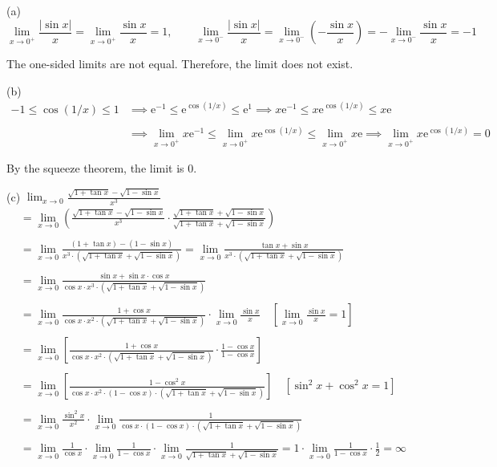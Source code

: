 \documentclass{article}
\begin{document}
\noindent (a) \begin{equation*}\lim_{x\to 0^+} \frac{\left|\sin x\right|}{x}=\lim_{x\to 0^+}\frac{\sin x}{x}=1,\quad\quad \lim_{x\to 0^-} \frac{\left|\sin x\right|}{x}=\lim_{x\to0^-}\left(-\frac{\sin x}{x}\right)=-\lim_{x\to0^-}\frac{\sin x}{x}=-1\end{equation*}

\hfill

\noindent The one-sided limits are not equal. Therefore, the limit does not exist.

\hfill

\noindent (b)
\begin{align*}-1\leq \cos(1/x)\leq1&\implies\mathrm{e}^{-1}\leq\mathrm{e}^{\cos(1/x)}\leq\mathrm{e}^1\implies x\mathrm{e}^{-1}\leq x\mathrm{e}^{\cos(1/x)}\leq x\mathrm{e}\\\\&\implies\lim_{x\to 0^+} x\mathrm{e}^{-1}\leq\lim_{x\to 0^+}  x\mathrm{e}^{\cos(1/x)}\leq\lim_{x\to 0^+} x\mathrm{e}\implies\lim_{x\to 0^+} x\mathrm{e}^{\cos(1/x)}=0\end{align*}

\hfill

\noindent By the squeeze theorem, the limit is 0.

\hfill

\noindent (c) $\displaystyle\lim_{x\to0}\frac{\sqrt{1+\tan x}-\sqrt{1-\sin x}}{x^3}$
\begin{align*}
&=\lim_{x\to0}\left(\frac{\sqrt{1+\tan x}-\sqrt{1-\sin x}}{x^3}\cdot\frac{\sqrt{1+\tan x}+\sqrt{1-\sin x}}{\sqrt{1+\tan x}+\sqrt{1-\sin x}}\right)\\\\&=\lim_{x\to0}\frac{(1+\tan x)-(1-\sin x)}{x^3\cdot\left(\sqrt{1+\tan x}+\sqrt{1-\sin x}\right)}=\lim_{x\to0}\frac{\tan x+\sin x}{x^3\cdot\left(\sqrt{1+\tan x}+\sqrt{1-\sin x}\right)}\\\\&=\lim_{x\to0}\frac{\sin x+\sin x\cdot\cos x}{\cos x\cdot x^3\cdot\left(\sqrt{1+\tan x}+\sqrt{1-\sin x}\right)}\\\\&=\lim_{x\to0}\frac{1+\cos x}{\cos x\cdot x^2\cdot\left(\sqrt{1+\tan x}+\sqrt{1-\sin x}\right)}\cdot\lim_{x\to0}\frac{\sin x}{x}\quad\left[\lim_{x\to0}\frac{\sin x}x=1\right]\\\\&=\lim_{x\to0}\left[\frac{1+\cos x}{\cos x\cdot x^2\cdot\left(\sqrt{1+\tan x}+\sqrt{1-\sin x}\right)}\cdot\frac{1-\cos x}{1-\cos x}\right]\\\\&=\lim_{x\to0}\left[\frac{1-\cos^2x}{\cos x\cdot x^2\cdot(1-\cos x)\cdot\left(\sqrt{1+\tan x}+\sqrt{1-\sin x}\right)}\right]\quad\left[\sin^2x+\cos^2x=1\right]\\\\&=\lim_{x\to0}\frac{\sin^2x}{x^2}\cdot\lim_{x\to0}\frac1{\cos x\cdot(1-\cos x)\cdot\left(\sqrt{1+\tan x}+\sqrt{1-\sin x}\right)}\\\\&=\lim_{x\to0}\frac1{\cos x}\cdot\lim_{x\to0}\frac1{1-\cos x}\cdot\lim_{x\to0}\frac1{\sqrt{1+\tan x}+\sqrt{1-\sin x}}=1\cdot\lim_{x\to0}\frac1{1-\cos x}\cdot\frac12 =\boxed{\infty}\end{align*}
\end{document}
